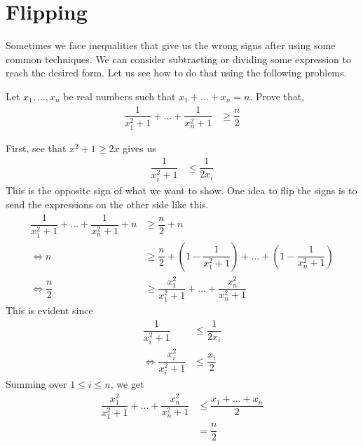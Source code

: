 \documentclass[inequalities.tex]{subfile}
\begin{document}
	\section{Flipping}
	Sometimes we face inequalities that give us the wrong signs after using some common techniques. We can consider subtracting or dividing some expression to reach the desired form. Let us see how to do that using the following problems.
		\begin{problem}
			Let $x_{1},\ldots,x_{n}$ be real numbers such that $x_{1}+\ldots+x_{n}=n$. Prove that,
				\begin{align*}
					\dfrac{1}{x_{1}^{2}+1}+\ldots+\dfrac{1}{x_{n}^{2}+1}
						& \geq \dfrac{n}{2}
				\end{align*}

				\begin{solution}
					First, see that $x^{2}+1\geq 2x$ gives us
						\begin{align*}
							\dfrac{1}{x_{i}^{2}+1}
								& \leq \dfrac{1}{2x_{i}}
						\end{align*}
					This is the opposite sign of what we want to show. One idea to flip the signs is to send the expressions on the other side like this.
						\begin{align*}
							\dfrac{1}{x_{1}^{2}+1}+\ldots+\dfrac{1}{x_{n}^{2}+1}+n
								& \geq \dfrac{n}{2}+n\\
							\iff n
								& \geq \dfrac{n}{2}+\left(1-\dfrac{1}{x_{1}^{2}+1}\right)+\ldots+\left(1-\dfrac{1}{x_{n}^{2}+1}\right)\\
							\iff \dfrac{n}{2}
								& \geq \dfrac{x_{1}^{2}}{x_{1}^{2}+1}+\ldots+\dfrac{x_{n}^{2}}{x_{n}^{2}+1}
						\end{align*}
					This is evident since
						\begin{align*}
							\dfrac{1}{x_{i}^{2}+1}
								& \leq \dfrac{1}{2x_{i}}\\
							\iff \dfrac{x_{i}^{2}}{x_{i}^{2}+1}
								& \leq \dfrac{x_{i}}{2}
						\end{align*}
					Summing over $1\leq i\leq n$, we get
						\begin{align*}
							\dfrac{x_{1}^{2}}{x_{1}^{2}+1}+\ldots+\dfrac{x_{n}^{2}}{x_{n}^{2}+1}
								& \leq \dfrac{x_{1}+\ldots+x_{n}}{2}\\
								& = \dfrac{n}{2}
						\end{align*}
				\end{solution}
		\end{problem}
\end{document}
